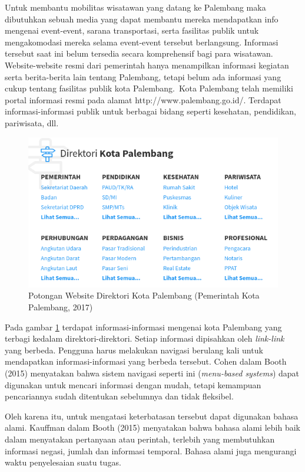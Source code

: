 Untuk membantu mobilitas wisatawan yang datang ke Palembang maka dibutuhkan sebuah media yang dapat membantu mereka mendapatkan info mengenai event-event, sarana transportasi, serta fasilitas publik untuk mengakomodasi mereka selama event-event tersebut berlangsung. Informasi tersebut saat ini belum tersedia secara komprehensif bagi para wisatawan. Website-website resmi dari pemerintah hanya menampilkan informasi kegiatan serta berita-berita lain tentang Palembang, tetapi belum ada informasi yang cukup tentang fasilitas publik kota Palembang.\ 
Kota Palembang telah memiliki portal informasi resmi pada alamat http://www.palembang.go.id/. Terdapat informasi-informasi publik untuk berbagai bidang seperti kesehatan, pendidikan, pariwisata, dll.\
\begin{figure}[H]
  \centering
    \includegraphics[scale=0.7]{gambar/palembanggoid.png}
    \caption{Potongan Website Direktori Kota Palembang (Pemerintah Kota Palembang, 2017)}
    \label{fig:plgportal}
\end{figure}
Pada gambar \ref{fig:plgportal} terdapat informasi-informasi mengenai kota Palembang yang terbagi kedalam direktori-direktori. Setiap informasi dipisahkan oleh \emph{link-link}  yang berbeda. Pengguna harus melakukan navigasi berulang kali untuk mendapatkan informasi-informasi yang berbeda tersebut. Cohen dalam Booth (2015) menyatakan bahwa sistem navigasi seperti ini (\emph{menu-based systems}) dapat digunakan untuk mencari informasi dengan mudah, tetapi kemampuan pencariannya sudah ditentukan sebelumnya dan tidak fleksibel.\

Oleh karena itu, untuk mengatasi keterbatasan tersebut dapat digunakan bahasa alami. Kauffman dalam Booth (2015) menyatakan bahwa bahasa alami lebih baik dalam menyatakan pertanyaan atau perintah, terlebih yang membutuhkan informasi negasi, jumlah dan informasi temporal. Bahasa alami juga mengurangi waktu penyelesaian suatu tugas.\

